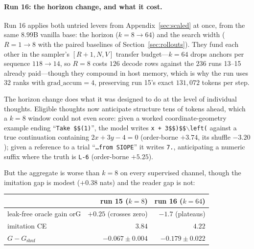 \documentclass{article} %
\newcommand{\gain}{G}
\begin{document}
\paragraph{Run 16: the horizon change, and what it cost.}
\label{sec:run16}
Run 16 applies both untried levers from Appendix~\ref{sec:scaled} at once, from the same $8.99$B vanilla base: the horizon ($k{=}8 \to 64$) and the search width ($R{=}1 \to 8$ with the paired baselines of Section~\ref{sec:rollouts}). They fund each other in the sampler's $[R{+}1,N,V]$ transfer budget---$k{=}64$ drops anchors per sequence $118 \to 14$, so $R{=}8$ costs $126$ decode rows against the $236$ runs 13--15 already paid---though they compound in host memory, which is why the run uses $32$ ranks with $\mathrm{grad\_accum}{=}4$, preserving run 15's exact $131{,}072$ tokens per step.

The horizon change does what it was designed to do at the level of individual thoughts. Eligible thoughts now anticipate structure tens of tokens ahead, which a $k{=}8$ window could not even score: given a worked coordinate-geometry example ending ``\texttt{Take \$\$(1)}'', the model writes \texttt{x + 3\$\$)\$\$$\backslash$left(} against a true continuation containing $2x+3y-4=0$ (order-borne $+3.74$, its shuffle $-3.20$); given a reference to a trial ``\texttt{\ldots from SIOPE}'' it writes \texttt{7.}, anticipating a numeric suffix where the truth is \texttt{L-6} (order-borne $+5.25$).

But the aggregate is worse than $k{=}8$ on every supervised channel, though the imitation gap is modest ($+0.38$ nats) and the reader gap is not:

\begin{center}\small
\begin{tabular}{lrr}
\toprule
 & run 15 ($k{=}8$) & run 16 ($k{=}64$) \\
\midrule
leak-free oracle gain $\mathrm{orG}$ & $+0.25$ (crosses zero) & $-1.7$ (plateaus) \\
imitation CE & $3.84$ & $4.22$ \\
$\gain - \gain_{\mathrm{shuf}}$ & $-0.067 \pm 0.004$ & $-0.179 \pm 0.022$ \\
\bottomrule
\end{tabular}
\end{center}
\end{document}
